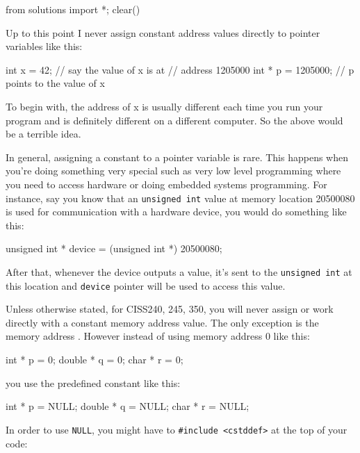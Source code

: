 \begin{python0}
from solutions import *; clear()
\end{python0}

Up to this point I never assign constant address values directly to
pointer variables like this:

\begin{consolethree}[escapeinside=||]
int x = 42;         // say the value of x is at
                    // address 1205000
int * p = 1205000;  // p points to the value of x
\end{consolethree}
To begin with, the address of x is usually different each time you run your program and is definitely different on a different computer. So the above would be a terrible idea.

In general, assigning a constant to a pointer variable is rare. This happens when you're doing something very special such as very low level programming where you need to access hardware or doing embedded systems programming. For instance, say you know that an \texttt{unsigned int} value at memory location 20500080 is used for communication with a hardware device, you would do something like this:

\begin{consolethree}[escapeinside=||]
unsigned int * device = (unsigned int *) 20500080;
\end{consolethree}

After that, whenever the device outputs a value, it's sent to the \texttt{unsigned int} at this location and \texttt{device} pointer will be used to access this value.

Unless otherwise stated, for CISS240, 245, 350, you will never assign or work directly with a constant memory address value. The only exception is the memory address . However instead of using memory address 0 like this:

\begin{consolethree}[escapeinside=||]
int * p = 0;
double * q = 0;
char * r = 0;
\end{consolethree}
you use the predefined constant \texttt{} like this:

\begin{consolethree}[escapeinside=||]
int * p = NULL;
double * q = NULL;
char * r = NULL;
\end{consolethree}

In order to use \texttt{NULL}, you might have to \texttt{\#include <cstddef>} at the top of your code:

